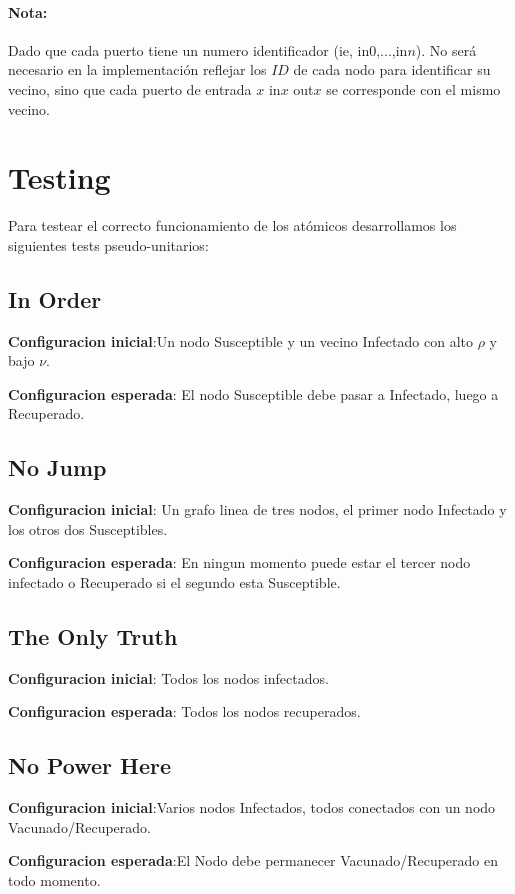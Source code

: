 \documentclass[10pt,a4paper]{article}
\begin{document}
\paragraph{Nota:} Dado que cada puerto tiene un numero identificador (ie, in0,...,in$n$). No ser\'a necesario en la implementaci\'on reflejar los $ID$ de cada nodo para identificar su vecino, sino que cada puerto de entrada $x$ in$x$ out$x$ se corresponde con el mismo vecino.   



\section*{Testing}


Para testear el correcto funcionamiento de los at\'omicos desarrollamos los siguientes tests pseudo-unitarios:
\subsection*{In Order}
\textbf{Configuracion inicial}:Un nodo Susceptible y un vecino Infectado con alto $\rho$ y bajo $\nu$.


\textbf{Configuracion esperada}: El nodo Susceptible debe pasar a Infectado, luego a Recuperado.


\subsection*{No Jump}
\textbf{Configuracion inicial}: Un grafo linea de tres nodos, el primer nodo Infectado y los otros dos Susceptibles.


\textbf{Configuracion esperada}: En ningun momento puede estar el tercer nodo infectado o Recuperado si el segundo esta Susceptible.


\subsection*{The Only Truth}
\textbf{Configuracion inicial}: Todos los nodos infectados.


\textbf{Configuracion esperada}: Todos los nodos recuperados.


\subsection*{No Power Here}
\textbf{Configuracion inicial}:Varios nodos Infectados, todos conectados con un nodo Vacunado/Recuperado.


\textbf{Configuracion esperada}:El Nodo debe permanecer Vacunado/Recuperado en todo momento.
\end{document}

